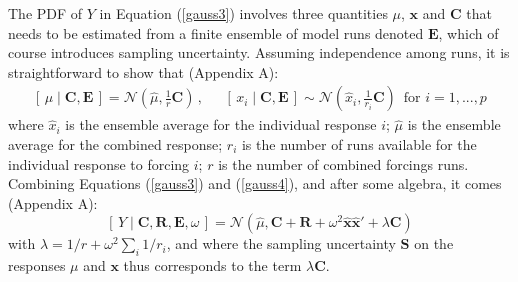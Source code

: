 \documentclass[12pt]{article}
\newcommand{\Sig}{\mbox{\boldmath \(\Sigma\)}}
\newcommand{\x}{\boldsymbol{x}}
\newcommand{\E}{\mathbf{E}}
\begin{document}
The PDF of $Y$ in Equation (\ref{gauss3}) involves three quantities $\mu$, $\x$ and $\mathbf C$ that needs to be estimated from a finite ensemble of model runs denoted $\E$, which of course introduces sampling uncertainty. %
Assuming independence among runs, it is straightforward to show that (Appendix A):
\begin{equation} 
\label{gauss4}
\begin{array}{ll}
\left[\,\mu\mid \mathbf{C}, \E\,\right] =\mathcal{N}(\widehat{\mu},\frac{1}{r}\mathbf{C})\,,&\,\,\,\,\left[\,x_i\mid \mathbf{C}, \E\,\right] \sim\mathcal{N}(\widehat{x}_i,\frac{1}{r_i}\mathbf{C})\,\,\,\textrm{for $i=1,...,p$}
\end{array}
\end{equation}
where $\widehat{x}_i$ is the ensemble average for the individual response $i$; $\widehat{\mu}$ is the ensemble average for the combined response; $r_i$ is the number of runs available for the individual response to forcing $i$; $r$ is the number of combined forcings runs. %
Combining Equations (\ref{gauss3}) and (\ref{gauss4}), and after some algebra, it comes (Appendix A):
\begin{equation} 
\label{gauss5}
\left[\,Y\mid \mathbf{C}, \mathbf{R},\E,\omega\,\right] =\mathcal{N}(\widehat{\mu},\mathbf{C}+\mathbf{R}+\omega^2\widehat{\x}\widehat{\x}'+\lambda\mathbf{C})
\end{equation}
with $\lambda=1/r + \omega^2 \sum_i 1/r_i$, and where the sampling uncertainty $\mathbf S$ on the responses $\mu$ and $\x$ thus corresponds to the term $\lambda\mathbf{C}$.
\end{document}

